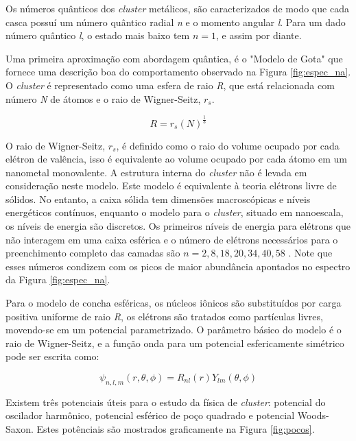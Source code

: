 Os números quânticos dos \textit{cluster} metálicos, são caracterizados de modo que cada casca possuí um número quântico radial \textit{n} e o momento angular \textit{l}. Para um dado número quântico \textit{l}, o estado mais baixo tem $n = 1$, e assim por diante.


Uma primeira aproximação com abordagem quântica, é o "Modelo de Gota" que fornece uma descrição boa do comportamento observado na Figura \ref{fig:espec_na}. O \textit{cluster} é representado como uma esfera de raio \textit{R}, que está relacionada com número \textit{N} de átomos e o raio de Wigner-Seitz, $r_{s}$\cite{capitulo_livro_shell}\cite{livro_cap16_Misra2012527}.


\begin{equation}
\label{eq:raio_R}
    R = r_{s}(N)^{\frac{1}{3}}
\end{equation}

O raio de Wigner-Seitz, $r_{s}$, é definido como o raio do volume ocupado por cada elétron de valência, isso é equivalente ao volume ocupado por cada átomo em um nanometal monovalente.
A estrutura interna do \textit{cluster} não é levada em consideração neste modelo. Este modelo é equivalente à teoria elétrons livre de sólidos. No entanto, a caixa sólida tem dimensões macroscópicas e níveis energéticos contínuos, enquanto o modelo para o \textit{cluster}, situado em nanoescala, os níveis de energia são discretos. Os primeiros níveis de energia para elétrons que não interagem em uma caixa esférica e o número de elétrons necessários para o preenchimento completo das camadas são $n= 2,8,18,20,34,40,58$ \cite{livro_cap16_Misra2012527}. Note que esses números condizem com os picos de maior abundância apontados no espectro da Figura \ref{fig:espec_na}.






Para o modelo de concha esféricas, os núcleos iônicos são substituídos por carga positiva uniforme de raio \textit{R}, os elétrons são tratados como partículas livres, movendo-se em um potencial parametrizado. O parâmetro básico do modelo é o raio de Wigner-Seitz, e a função onda para um potencial esfericamente simétrico pode ser escrita como:

\begin{equation}
    \psi_{ n,l,m}(r, \theta, \phi) = R_{nl}(r)Y_{lm}(\theta, \phi)
\end{equation}

Existem três potenciais úteis para o estudo da física de \textit{cluster}: potencial do oscilador harmônico, potencial esférico de poço quadrado e potencial Woods-Saxon. Estes potênciais são mostrados graficamente na Figura \ref{fig:pocos}.

